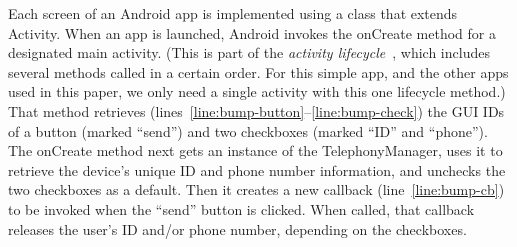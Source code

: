 \documentclass{llncs}
\newcommand{\code}[1]{\textsf{#1}} %
\newcommand{\comment}[3][\color{red}]{{#1{[{#2}: {#3}]}}}
\newcommand{\kris}[1]{\comment[\color{orange}]{kris}{#1}}
\newcommand{\jeff}[1]{\comment[\color{green}]{JSF}{#1}}
\begin{document}
Each screen of an Android app is implemented using a class that
extends \code{Activity}. When an app is launched, Android invokes the
\code{onCreate} method for a designated main activity.
(This is part of the \emph{activity lifecycle}~\cite{Android:15},
which includes several methods called in a certain order. For this
simple app, and the other apps used in this paper, we only need a
single activity with this one lifecycle method.)
That method retrieves
(lines~\ref{line:bump-button}--\ref{line:bump-check}) the GUI IDs of a
button (marked ``send'') and
two checkboxes (marked ``ID'' and ``phone''). The \code{onCreate} method next
gets an instance of the \code{TelephonyManager}, uses it
to retrieve the device's unique ID and phone number information, and unchecks the two
checkboxes as a default. Then it creates a new callback
(line~\ref{line:bump-cb}) to be invoked when the ``send'' button is
clicked. When called, that callback releases the user's ID and/or
phone number, depending on the checkboxes.
\end{document}
